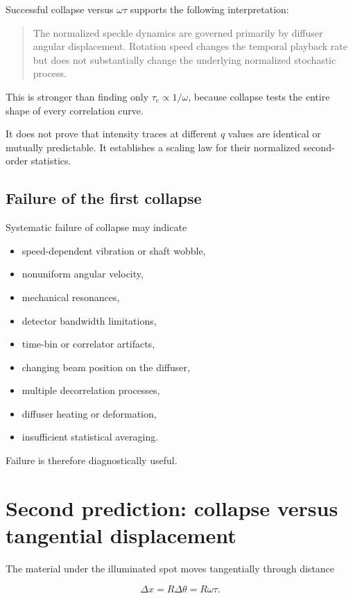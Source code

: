 \documentclass[11pt,letterpaper]{article}
\begin{document}
Successful collapse versus $\omega\tau$ supports the following interpretation:

\begin{quote}
The normalized speckle dynamics are governed primarily by diffuser angular
displacement. Rotation speed changes the temporal playback rate but does not
substantially change the underlying normalized stochastic process.
\end{quote}

This is stronger than finding only $\tau_c\propto 1/\omega$, because collapse
tests the entire shape of every correlation curve.

It does not prove that intensity traces at different $q$ values are identical
or mutually predictable. It establishes a scaling law for their normalized
second-order statistics.

\subsection{Failure of the first collapse}

Systematic failure of collapse may indicate

\begin{itemize}[leftmargin=2em]
    \item speed-dependent vibration or shaft wobble,
    \item nonuniform angular velocity,
    \item mechanical resonances,
    \item detector bandwidth limitations,
    \item time-bin or correlator artifacts,
    \item changing beam position on the diffuser,
    \item multiple decorrelation processes,
    \item diffuser heating or deformation,
    \item insufficient statistical averaging.
\end{itemize}

Failure is therefore diagnostically useful.

\section{Second prediction: collapse versus tangential displacement}

The material under the illuminated spot moves tangentially through distance

\begin{equation}
    \Delta x = R\Delta\theta=R\omega\tau.
    \label{eq:tangential_displacement}
\end{equation}
\end{document}
